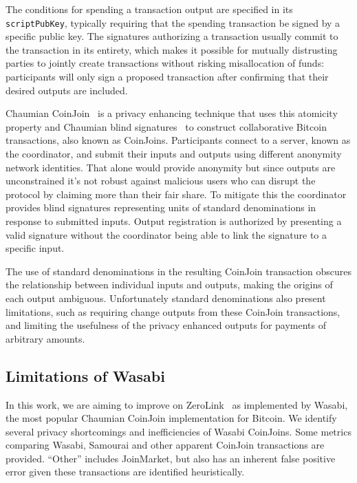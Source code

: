 \documentclass{article}
\begin{document}
The conditions for spending a transaction output are specified in its \texttt{scriptPubKey}, typically requiring that the spending transaction be signed by a specific public key. The signatures authorizing a transaction usually commit to the transaction in its entirety, which makes it possible for mutually distrusting parties to jointly create transactions without risking misallocation of funds: participants will only sign a proposed transaction after confirming that their desired outputs are included.

Chaumian CoinJoin~\cite{mizrahi2013blind}\cite{maxwell2013coinjoin}\cite{zerolink} is a privacy enhancing technique that uses this atomicity property and Chaumian blind signatures~\cite{chaum1983blind} to construct collaborative Bitcoin transactions, also known as CoinJoins. Participants connect to a server, known as the coordinator, and submit their inputs and outputs using different anonymity network identities. That alone would provide anonymity but since outputs are unconstrained it's not robust against malicious users who can disrupt the protocol by claiming more than their fair share. To mitigate this the coordinator provides blind signatures representing units of standard denominations in response to submitted inputs. Output registration is authorized by presenting a valid signature without the coordinator being able to link the signature to a specific input.

The use of standard denominations in the resulting CoinJoin transaction obscures the relationship between individual inputs and outputs, making the origins of each output ambiguous. Unfortunately standard denominations also present limitations, such as requiring change outputs from these CoinJoin transactions, and limiting the usefulness of the privacy enhanced outputs for payments of arbitrary amounts.

\subsection{Limitations of Wasabi}
In this work, we are aiming to improve on ZeroLink~\cite{zerolink} as implemented by Wasabi, the most popular Chaumian CoinJoin implementation for Bitcoin. We identify several privacy shortcomings and inefficiencies of Wasabi CoinJoins. Some metrics comparing Wasabi, Samourai and other apparent CoinJoin transactions are provided. ``Other'' includes JoinMarket, but also has an inherent false positive error given these transactions are identified heuristically.
\end{document}
